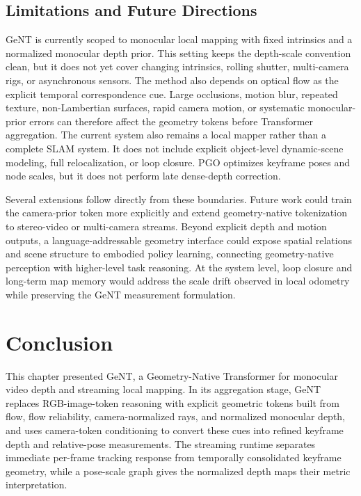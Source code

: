 \subsection{Limitations and Future Directions}
GeNT is currently scoped to monocular local mapping with fixed intrinsics and a normalized monocular depth prior.
This setting keeps the depth-scale convention clean, but it does not yet cover changing intrinsics, rolling shutter, multi-camera rigs, or asynchronous sensors.
The method also depends on optical flow as the explicit temporal correspondence cue.
Large occlusions, motion blur, repeated texture, non-Lambertian surfaces, rapid camera motion, or systematic monocular-prior errors can therefore affect the geometry tokens before Transformer aggregation.
The current system also remains a local mapper rather than a complete SLAM system.
It does not include explicit object-level dynamic-scene modeling, full relocalization, or loop closure.
PGO optimizes keyframe poses and node scales, but it does not perform late dense-depth correction.

Several extensions follow directly from these boundaries.
Future work could train the camera-prior token more explicitly and extend geometry-native tokenization to stereo-video or multi-camera streams.
Beyond explicit depth and motion outputs, a language-addressable geometry interface could expose spatial relations and scene structure to embodied policy learning, connecting geometry-native perception with higher-level task reasoning.
At the system level, loop closure and long-term map memory would address the scale drift observed in local odometry while preserving the GeNT measurement formulation.

\section{Conclusion}
\label{sec:geont_conclusion}
This chapter presented GeNT, a Geometry-Native Transformer for monocular video depth and streaming local mapping.
In its aggregation stage, GeNT replaces RGB-image-token reasoning with explicit geometric tokens built from flow, flow reliability, camera-normalized rays, and normalized monocular depth, and uses camera-token conditioning to convert these cues into refined keyframe depth and relative-pose measurements.
The streaming runtime separates immediate per-frame tracking response from temporally consolidated keyframe geometry, while a pose-scale graph gives the normalized depth maps their metric interpretation.

